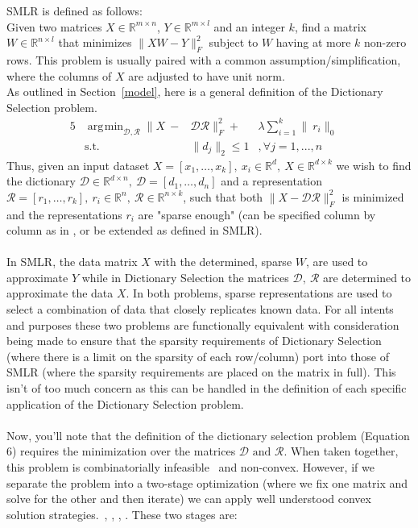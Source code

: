 \documentclass{article}
\newcommand{\R}{\mathbb{R}}
\newcommand{\Rr}{\mathcal{R}}
\newcommand{\D}{\mathcal{D}}
\DeclareMathOperator*{\argmin}{\arg\!\min}
\begin{document}
\noindent SMLR is defined as follows:\\
Given two matrices $X\in\R^{m\times n}$, $Y\in\R^{m\times l}$ and an integer $k$, find a matrix  $W\in\R^{n\times l}$ that minimizes $\|XW-Y\|^2_F$ subject to $W$ having at more $k$ non-zero rows. This problem is usually paired with a common assumption/simplification, where the columns of $X$ are adjusted to have unit norm.
\\

\noindent As outlined in Section~\ref{model}, here is a general definition of the Dictionary Selection problem.
\begin{alignat}{5}
         & \argmin_{\D, \Rr} \|X \ -&\D\Rr\|_F^2  + &\lambda \sum_{i=1}^k  \|\ r_i\|_0     \quad   \\
         &\text{s.t.}  \quad  &\|d_j\|_2 \leq 1&, \forall j=1, ...,n  \quad 
\end{alignat}
Thus, given an input dataset $X=[x_1, \dots, x_k], \ x_i\in\R^d, \ X\in\R^{d\times k}$ we wish to find the dictionary $\D\in\R^{d\times n}, \ \D = [d_1, \dots, d_n]$ and a representation $\Rr=[r_1,\dots,r_k], \ r_i\in\R^n, \ \Rr\in\R^{n\times k}$, such that both $\|X-\D\Rr\|_F^2$ is minimized and the representations $r_i$ are "sparse enough" (can be specified column by column as in \cite{rIBP}, or be extended as defined in SMLR).\\
\\
\noindent In SMLR, the data matrix $X$ with the determined, sparse $W$, are used to approximate $Y$ while in Dictionary Selection the matrices $\D,\ \Rr$ are determined to approximate the data $X$. In both problems, sparse representations are used to select a combination of data that closely replicates known data. For all intents and purposes these two problems are functionally equivalent with consideration being made to ensure that the sparsity requirements of Dictionary Selection (where there is a limit on the sparsity of each row/column) port into those of SMLR (where the sparsity requirements are placed on the matrix in full). This isn't of too much concern as this can be handled in the definition of each specific application of the Dictionary Selection problem.\\
\\
Now, you'll note that the definition of the dictionary selection problem (Equation 6) requires the minimization over the matrices $\D\text{ and }\Rr$. When taken together, this problem is combinatorially infeasible~\cite{NPHardproof} and non-convex. However, if we separate the problem into a two-stage optimization (where we fix one matrix and solve for the other and then iterate) we can apply well understood convex solution strategies.~\cite{submod_spectral}, \cite{greedy_selection}, \cite{rIBP}, \cite{Singer16TwoStage}. These two stages are: 
\end{document}
